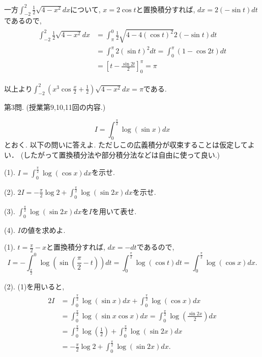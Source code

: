 \documentclass[dvipdfmx,a4paper,11pt]{article}
\theoremstyle{definition}
\begin{document}
一方$\int_{-2}^{2} \frac{1}{2} \sqrt{4 - x^2} dx$について, $x = 2\cos t$と置換積分すれば, $dx = 2 (- \sin t) dt$であるので, 
  \begin{align*}
\begin{split}
\int_{-2}^{2} \frac{1}{2} \sqrt{4 - x^2} dx 
&= \int_{\pi}^{0} \frac{1}{2} \sqrt{4 - 4 (\cos t)^2} 2 (- \sin t) dt \\
&= \int^{\pi}_{0} 2 (\sin t)^2 dt 
 = \int^{\pi}_{0} (1 -  \cos 2t)dt \\
&= \left[t - \frac{\sin 2t}{2} \right]^{\pi}_{0} = \pi
\end{split}
\end{align*}

以上より$
\int_{-2}^{2} \left( x^3 \cos \frac{x}{2} + \frac{1}{2} \right) \sqrt{4 - x^2} dx
 = \pi$である.
 
   \vspace{33pt}
   
  {\Large 第3問.} (授業第9,10,11回の内容.)
    \vspace{11pt}
 
$$
I = \int_{0}^{\frac{\pi}{2}} \log (\sin x) dx
$$
とおく.
以下の問いに答えよ.
ただしこの広義積分が収束することは仮定してよい．
(したがって置換積分法や部分積分法などは自由に使って良い.)
     
     \vspace{11pt}
     
(1).  $I = \int_{0}^{\frac{\pi}{2}} \log (\cos x) dx$を示せ.

\vspace{11pt}

(2).  $2I = - \frac{\pi}{2}  \log 2 + \int_{0}^{\frac{\pi}{2}} \log (\sin 2x) dx$を示せ.

\vspace{11pt}

(3).  $\int_{0}^{\frac{\pi}{2}} \log (\sin 2x) dx$を$I$を用いて表せ.

\vspace{11pt}

(4). $I$の値を求めよ.
 \vspace{11pt}
 
\hspace{-11pt}{\Large $\bullet$ 第3問解答例.}

(1). $t = \frac{\pi}{2} -x$と置換積分すれば, $dx = -dt$であるので, 
$$
I= - \int_{\frac{\pi}{2}}^{0} \log(\sin(\frac{\pi}{2}-t))dt
= \int_{0}^{\frac{\pi}{2}} \log (\cos t) dt = \int_{0}^{\frac{\pi}{2}} \log (\cos x) dx.
$$

(2). (1)を用いると, 
  \begin{align*}
\begin{split}
2I &=\int_{0}^{\frac{\pi}{2}} \log (\sin x) dx+ \int_{0}^{\frac{\pi}{2}} \log (\cos x) dx \\
&=\int_{0}^{\frac{\pi}{2}} \log (\sin x \cos x) dx
=\int_{0}^{\frac{\pi}{2}} \log (\frac{\sin 2x}{2}) dx \\
&= \int_{0}^{\frac{\pi}{2}} \log( \frac{1}{2}) + \int_{0}^{\frac{\pi}{2}} \log (\sin 2x) dx \\
&=-\frac{\pi}{2} \log2 + \int_{0}^{\frac{\pi}{2}} \log (\sin 2x) dx.
\end{split}
\end{align*}
\end{document}
